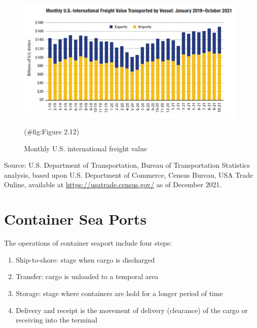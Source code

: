 \documentclass[
]{book}
\providecommand{\tightlist}{%
  \setlength{\itemsep}{0pt}\setlength{\parskip}{0pt}}
\begin{document}
\begin{figure}

{\centering \includegraphics{./Images/Intro/Monthly U.S. international freight value} 

}

\caption{Monthly U.S. international freight value}(\#fig:Figure 2.12)
\end{figure}

Source: U.S. Department of Transportation, Bureau of Transportation Statistics analysis, based upon U.S. Department of Commerce, Census Bureau, USA Trade Online, available at \url{https://usatrade.census.gov/} as of December 2021.

\hypertarget{intro-container_port}{%
\section{Container Sea Ports}\label{intro-container_port}}

The operations of container seaport include four steps:

\begin{enumerate}
\def\labelenumi{\arabic{enumi})}
\tightlist
\item
  Ship-to-shore: stage when cargo is discharged
\item
  Transfer: cargo is unloaded to a temporal area
\item
  Storage: stage where containers are hold for a longer period of time
\item
  Delivery and receipt is the movement of delivery (clearance) of the cargo or receiving into the terminal
\end{enumerate}
\end{document}
